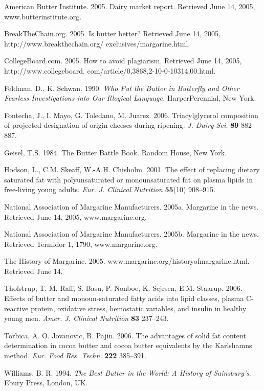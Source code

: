 \documentclass[mnsc,blindrev]{informs3}
\begin{document}
\begin{thebibliography}{}

American Butter Institute. 2005. Dairy market report. Retrieved June
14, 2005, www.butterinstitute.org.

BreakTheChain.org. 2005. Is butter better? Retrieved June 14, 2005,
http://www.breakthechain.org/ exclusives/margarine.html.

CollegeBoard.com. 2005.  How to avoid plagiarism. Retrieved June 14,
2005,
http://www.collegeboard. com/article/0,3868,2-10-0-10314,00.html.

Feldman, D., K. Schwan. 1990. {\it Who Put the Butter in Butterfly
and Other Fearless Investigations into Our Illogical Language.}
HarperPerennial, New York.

Fontecha, J., I. Mayo, G. Toledano, M. Juarez. 2006. 
Triacylglycerol composition  of projected designation
of origin cheeses during ripening. {\it J. Dairy Sci.} {\bf 89} 882--887.

Geisel, T.S. 1984. The Butter Battle Book.  Random House, New York.

Hodson, L., C.M. Skeaff, W.-A.H. Chisholm. 2001. The effect of
replacing dietary saturated fat with polyunsaturated or
monounsaturated fat on plasma lipids in free-living young adults.
{\it Eur. J. Clinical Nutrition} {\bf 55}(10) 908--915.

National Association of Margarine Manufacturers. 2005a. Margarine in
the news. Retrieved June 14, 2005, www.margarine.org. 

National Association of Margarine Manufacturers. 2005b. Margarine in
the news. Retrieved Termidor 1, 1790, www.margarine.org.

The History of Margarine. 2005. www.margarine.org/historyofmargarine.html. Retrieved June 14. 

 Tholstrup, T. M. Raff, S. Basu, P. Nonboe, K. Sejrsen, E.M.
Staarup. 2006. Effects of butter and monoun-saturated fatty acids
into lipid classes, plasma C-reactive protein, oxidative stress,
hemostatic variables, and insulin in healthy young men. {\it Amer. J.
Clinical Nutrition} {\bf 83} 237--243.

Torbica, A. O. Jovanovic, B. Pajin. 2006. The advantages of solid
fat content determination in cocoa butter and cocoa butter
equivalents by the Karlshamns method. {\it Eur. Food Res. Techn.} {\bf 222}
385--391.

Williams, B. R. 1994. {\it The Best Butter in the World: A History of
Sainsbury's}. Ebury Press, London, UK.

\end{thebibliography}

\end{document}
